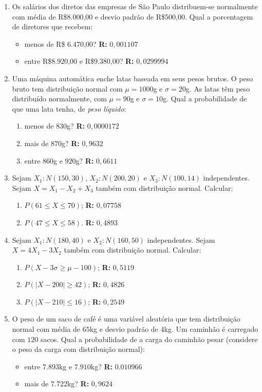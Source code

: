 \documentclass[oneside,a4paper,12pt]{article}
\begin{document}
\begin{enumerate}

	\item Os salários dos diretos das empresas de São Paulo distribuem-se normalmente com média de R\$8.000,00 e desvio padrão de R\$500,00. Qual a porcentagem de diretores que recebem:
	\begin{itemize}
		\item menos de R\$ 6.470,00? {\bf R: } $0,001107$
		\item entre R\$8.920,00 e R\$9.380,00? {\bf R: } $0,0299994$
	\end{itemize}

	\item Uma máquina automática enche latas baseada em seus pesos brutos. O peso bruto tem distribuição normal com $\mu = 1000$g e $\sigma = 20$g. As latas têm peso distribuído normalmente, com $\mu = 90$g e $\sigma = 10$g. Qual a probabilidade de que uma lata tenha, de \emph{peso líquido}:
	\begin{enumerate}
		\item menos de $830$g? {\bf R: } $0,0000172$
		\item mais de $870$g? {\bf R: } $0,9632$
		\item entre $860$g e $920$g? {\bf R: } $0,6611$
	\end{enumerate}

	\item Sejam $X_1:N(150,30)$, $X_2:N(200,20)$ e $X_3:N(100,14)$ independentes. Sejam $X = X_1 - X_2 + X_3$ também com distribuição normal. Calcular:
	\begin{enumerate}
		\item $P(61 \leq X \leq 70)$; {\bf R: }$0,07758$
		\item $P(47\leq X \leq 58)$. {\bf R: } $0,4893$
	\end{enumerate} 

	\item Sejam $X_1:N(180,40)$ e $X_2:N(160,50)$ independentes. Sejam $X = 4X_1 - 3X_2$ também com distribuição normal. Calcular:
	\begin{enumerate}
		\item $P(X-3\sigma \geq \mu - 100)$; {\bf R: } $0,5119$
		\item $P(|X-200|\geq 42)$; {\bf R: } $0,4826$
		\item $P(|X-210|\leq 16)$; {\bf R: } $0,2549$
	\end{enumerate}

	\item O peso de um saco de café é uma variável aleatória que tem distribuição normal com média de $65$kg e desvio padrão de $4$kg. Um caminhão é carregado com $120$ sacos. Qual a probabilidade de a carga do caminhão pesar (considere o peso da carga com distribuição normal):
	\begin{itemize}
		\item entre $7.893$kg e $7.910$kg? {\bf R: } $0.010966$
		\item mais de $7.722$kg? {\bf R: }$0,9624$
	\end{itemize}


\end{enumerate}
\end{document}
